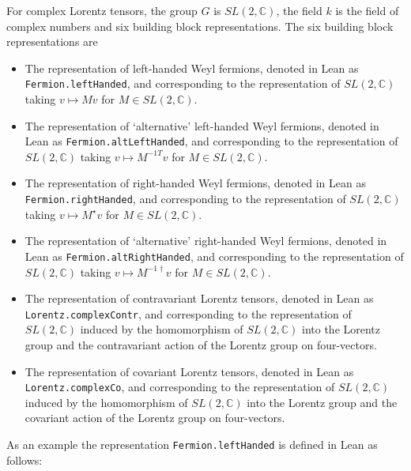 \documentclass[a4paper, 11pt]{article}
\begin{document}
For complex Lorentz tensors, the group $G$ is $SL(2, \mathbb{C})$, the field $k$ is the 
field of complex numbers and six building block representations. The six building block representations 
are
\begin{itemize}
  \item The representation of left-handed Weyl fermions, 
    denoted in Lean as \lstinline|Fermion.leftHanded|, and corresponding to the 
    representation of $SL(2, \mathbb{C})$ taking $v \mapsto M v$ for $M \in SL(2, \mathbb{C})$.
  \item The representation of `alternative' left-handed Weyl fermions, 
    denoted in Lean as \lstinline|Fermion.altLeftHanded|, and corresponding to the 
    representation of $SL(2, \mathbb{C})$ taking $v \mapsto M^{-1 T} v$ for $M \in SL(2, \mathbb{C})$.
  \item The representation of right-handed Weyl fermions, 
    denoted in Lean as \lstinline|Fermion.rightHanded|, and corresponding to the 
    representation of $SL(2, \mathbb{C})$ taking $v \mapsto M^\star v$ for $M \in SL(2, \mathbb{C})$.
  \item The representation of `alternative' right-handed Weyl fermions,
    denoted in Lean as \lstinline|Fermion.altRightHanded|, and corresponding to the 
    representation of $SL(2, \mathbb{C})$ taking $v \mapsto M^{-1 \dagger} v$ for $M \in SL(2, \mathbb{C})$.
  \item The representation of contravariant Lorentz tensors, 
    denoted in Lean as \lstinline|Lorentz.complexContr|, and corresponding to the 
    representation of $SL(2, \mathbb{C})$ induced by the homomorphism of $SL(2, \mathbb{C})$ into 
    the Lorentz group and the contravariant action of the Lorentz group on four-vectors.
  \item The representation of covariant Lorentz tensors,
     denoted in Lean as \lstinline|Lorentz.complexCo|, and corresponding to the 
    representation of $SL(2, \mathbb{C})$ induced by the homomorphism of $SL(2, \mathbb{C})$ into 
    the Lorentz group and the covariant action of the Lorentz group on four-vectors.
\end{itemize}
As an example the representation \lstinline|Fermion.leftHanded| is defined in Lean as follows:
\end{document}
